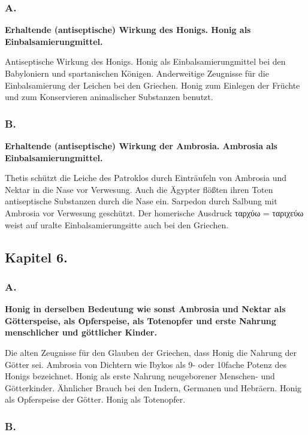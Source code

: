 \documentclass[a4paper, 11pt, oneside]{article}
\begin{document}
\subsubsection*{A.}

\textbf{Erhaltende (antiseptische) Wirkung des Honigs. Honig als Einbalsamierungmittel.}

Antiseptische Wirkung des Honigs. Honig als Einbalsamierungmittel bei den Babyloniern und spartanischen Königen. Anderweitige Zeugnisse für die Einbalsamierung der Leichen bei den Griechen. Honig zum Einlegen der Früchte und zum Konservieren animalischer Substanzen benutzt.

\subsubsection*{B.}

\textbf{Erhaltende (antiseptische) Wirkung der Ambrosia. Ambrosia als Einbalsamierungmittel.}

Thetis schützt die Leiche des Patroklos durch Einträufeln von Ambrosia und Nektar in die Nase vor Verwesung. Auch die Ägypter flößten ihren Toten antiseptische Substanzen durch die Nase ein. Sarpedon durch Salbung mit Ambrosia vor Verwesung geschützt. Der homerische Ausdruck ταρχύω = ταριχεύω weist auf uralte Einbalsamierungsitte auch bei den Griechen.

\subsection*{Kapitel 6.}

\subsubsection*{A.}

\textbf{Honig in derselben Bedeutung wie sonst Ambrosia und Nektar als Götterspeise, als Opferspeise, als Totenopfer und erste Nahrung menschlicher und göttlicher Kinder.}

Die alten Zeugnisse für den Glauben der Griechen, dass Honig die Nahrung der Götter sei. Ambrosia von Dichtern wie Ibykos als 9- oder 10fache Potenz des Honigs bezeichnet. Honig als erste Nahrung neugeborener Menschen- und Götterkinder. Ähnlicher Brauch bei den Indern, Germanen und Hebräern. Honig als Opferspeise der Götter. Honig als Totenopfer.

\subsubsection*{B.}
\end{document}
